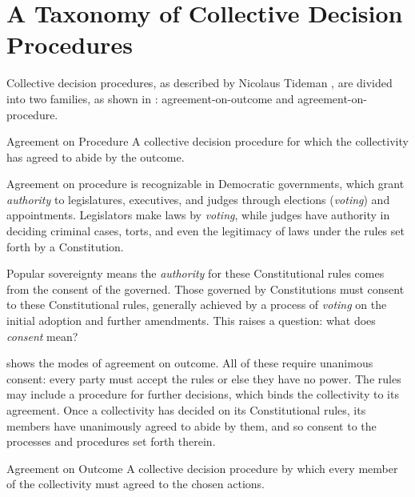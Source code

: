\chapter{A Taxonomy of Collective Decision Procedures}
\label {apx:taxonomy-of-collective-decision-procedures}

Collective decision procedures, as described by Nicolaus Tideman \autocite[9-21]{Tideman2006}, are divided into two families, as shown in : agreement-on-outcome and agreement-on-procedure.



\begin{definition}{Agreement on Procedure}
    A collective decision procedure for which the collectivity has agreed to abide by the outcome.
\end{definition}

Agreement on procedure is recognizable in Democratic governments, which grant \textit{authority} to legislatures, executives, and judges through elections (\textit{voting}) and appointments.  Legislators make laws by \textit{voting}, while judges have authority in deciding criminal cases, torts, and even the legitimacy of laws under the rules set forth by a Constitution.

Popular sovereignty means the \textit{authority} for these Constitutional rules comes from the consent of the governed.  Those governed by Constitutions must consent to these Constitutional rules, generally achieved by a process of \textit{voting} on the initial adoption and further amendments.  This raises a question:  what does \textit{consent} mean?



 shows the modes of agreement on outcome.  All of these require unanimous consent:  every party must accept the rules or else they have no power.  The rules may include a procedure for further decisions, which binds the collectivity to its agreement.  Once a collectivity has decided on its Constitutional rules, its members have unanimously agreed to abide by them, and so consent to the processes and procedures set forth therein.

\begin{definition}{Agreement on Outcome}
    A collective decision procedure by which every member of the collectivity must agreed to the chosen actions.
\end{definition}

